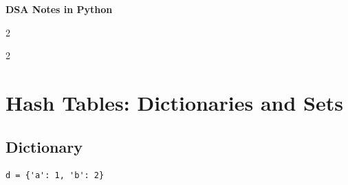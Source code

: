 \documentclass[9pt,a4paper]{extarticle}
\begin{document}
\begin{center}
{\LARGE\bfseries DSA Notes in Python}
\end{center}
\vspace{-4pt}
\begin{multicols}{2}
\small
\tableofcontents
\end{multicols}
\newpage
\begin{multicols}{2}
\section{Hash Tables: Dictionaries and Sets}

\subsection{Dictionary}

\begin{lstlisting}
d = {'a': 1, 'b': 2}
\end{lstlisting}


\end{multicols}
\end{document}
